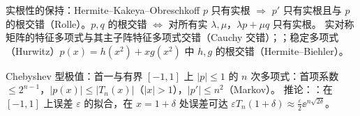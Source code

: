 \begin{结论}{实根性的保持：Hermite--Kakeya--Obreschkoff}
$p$ 只有实根 $\Rightarrow$ $p'$ 只有实根且与 $p$ 的根交错（Rolle）。$p,q$ 的根交错 $\iff$ 对所有实 $\lambda,\mu$，$\lambda p+\mu q$ 只有实根。
实对称矩阵的特征多项式与其主子阵特征多项式交错（Cauchy 交错）；；稳定多项式（Hurwitz）$p(x)=h(x^2)+xg(x^2)$ 中 $h,g$ 的根交错（Hermite--Biehler）。
\end{结论}

\begin{结论}{Chebyshev 型极值：首一与有界}
$[-1,1]$ 上 $|p|\le1$ 的 $n$ 次多项式：首项系数 $\le2^{n-1}$，$|p(x)|\le|T_n(x)|$（$|x|>1$），$|p'|\le n^2$（Markov）。
推论：：在 $[-1,1]$ 上误差 $\varepsilon$ 的拟合，在 $x=1+\delta$ 处误差可达 $\varepsilon T_n(1+\delta)\approx\frac\varepsilon2\ee^{n\sqrt{2\delta}}$。
\end{结论}


